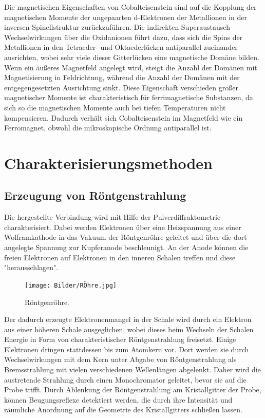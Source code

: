 \documentclass[a4paper,12pt,bibliography=totocnumbered]{scrartcl}
\begin{document}
Die magnetischen Eigenschaften von Cobalteisenstein sind auf die Kopplung der magnetischen Momente der ungepaarten d-Elektronen der Metallionen in  der inversen Spinellstruktur zurückzuführen. \cite{Müller}
Die indirekten Superaustausch-Wechselwirkungen über die Oxidanionen führt dazu, dass sich die Spins der Metallionen in den Tetraeder- und Oktaederlücken antiparallel zueinander ausrichten, wobei sehr viele dieser Gitterlücken eine magnetische Domäne bilden. 
Wenn ein äußeres Magnetfeld angelegt wird, steigt die Anzahl der Domänen mit Magnetisierung in Feldrichtung, während die Anzahl der Domänen mit der entgegengesetzten Ausrichtung sinkt. 
Diese Eigenschaft verschieden großer magnetischer Momente ist charakteristisch für ferrimagnetische Substanzen, da sich so die magnetischen Momente auch bei tiefen Temperaturen nicht kompensieren. 
Dadurch verhält sich Cobalteisenstein im Magnetfeld wie ein Ferromagnet, obwohl die mikroskopische Ordnung antiparallel ist. \cite{Müller}

\section{Charakterisierungsmethoden}

\subsection{Erzeugung von Röntgenstrahlung}
Die hergestellte Verbindung wird mit Hilfe der Pulverdiffraktometrie charakterisiert.
Dabei werden Elektronen über eine Heizspannung aus einer Wolframkathode in das Vakuum der Röntgenröhre geleitet und über die dort angelegte Spannung zur Kupferanode beschleunigt. 
An der Anode können die freien Elektronen auf Elektronen in den inneren Schalen treffen und diese "herausschlagen".
\begin{figure}[H]
    \centering
    \texttt{[image: Bilder/RÖhre.jpg]}
    \caption{Röntgenröhre. \cite{Kristallgitter}}
    \label{fig: Röhre}
\end{figure}
Der dadurch erzeugte Elektronenmangel in der Schale wird durch ein Elektron aus einer höheren Schale ausgeglichen, wobei dieses beim Wechseln der Schalen Energie in Form von charakteristischer Röntgenstrahlung freisetzt. 
Einige Elektronen dringen stattdessen bis zum Atomkern vor. 
Dort werden sie durch Wechselwirkungen mit dem Kern unter Abgabe von Röntgenstrahlung als Bremsstrahlung mit vielen verschiedenen Wellenlängen abgelenkt.
Daher wird die austretende Strahlung durch einen Monochromator geleitet, bevor sie auf die Probe trifft. 
Durch Ablenkung der Röntgenstrahlung am Kristallgitter der Probe, können Beugungsreflexe detektiert werden, die durch ihre Intensität und räumliche Anordnung auf die Geometrie des Kristallgitters schließen lassen.
\end{document}
